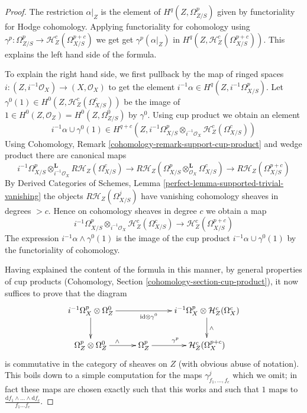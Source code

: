 \documentclass[10pt,a4paper]{amsart}
\theoremstyle{plain}
\theoremstyle{definition}
\theoremstyle{remark}
\numberwithin{equation}{subsection}
\begin{document}
\begin{proof}
The restriction $\alpha|_Z$ is the element of $H^q(Z, \Omega^p_{Z/S})$
given by functoriality for Hodge cohomology. Applying functoriality
for cohomology using
$\gamma^p : \Omega^p_{Z/S} \to \mathcal{H}^c_Z(\Omega^{p + c}_{X/S})$
we get get $\gamma^p(\alpha|_Z)$ in
$H^q(Z, \mathcal{H}^c_Z(\Omega^{p + c}_{X/S}))$.
This explains the left hand side of the formula.

\medskip\noindent
To explain the right hand side, we first pullback by the map
of ringed spaces $i : (Z, i^{-1}\mathcal{O}_X) \to (X, \mathcal{O}_X)$
to get the element $i^{-1}\alpha \in H^q(Z, i^{-1}\Omega^p_{X/S})$.
Let $\gamma^0(1) \in H^0(Z, \mathcal{H}_Z^c(\Omega^c_{X/S}))$
be the image of $1 \in H^0(Z, \mathcal{O}_Z) = H^0(Z, \Omega^0_{Z/S})$
by $\gamma^0$. Using cup product we obtain an element
$$
i^{-1}\alpha \cup \gamma^0(1)
\in
H^{q + c}(Z, 
i^{-1}\Omega^p_{X/S} \otimes_{i^{-1}\mathcal{O}_X}
\mathcal{H}^c_Z(\Omega^c_{X/S}))
$$
Using Cohomology, Remark \ref{cohomology-remark-support-cup-product}
and wedge product there are canonical maps
$$
i^{-1}\Omega^p_{X/S} \otimes_{i^{-1}\mathcal{O}_X}^\mathbf{L}
R\mathcal{H}_Z(\Omega^c_{X/S}) \to
R\mathcal{H}_Z(\Omega^p_{X/S} \otimes_{\mathcal{O}_X}^\mathbf{L}
\Omega^c_{X/S}) \to
R\mathcal{H}_Z(\Omega^{p + c}_{X/S})
$$
By Derived Categories of Schemes, Lemma
\ref{perfect-lemma-supported-trivial-vanishing}
the objects $R\mathcal{H}_Z(\Omega^j_{X/S})$ have vanishing
cohomology sheaves in degrees $> c$. Hence on cohomology
sheaves in degree $c$ we obtain a map
$$
i^{-1}\Omega^p_{X/S} \otimes_{i^{-1}\mathcal{O}_X}
\mathcal{H}^c_Z(\Omega^c_{X/S}) \longrightarrow
\mathcal{H}^c_Z(\Omega^{p + c}_{X/S})
$$
The expression $i^{-1}\alpha \wedge \gamma^0(1)$ is the image
of the cup product $i^{-1}\alpha \cup \gamma^0(1)$ by the
functoriality of cohomology.

\medskip\noindent
Having explained the content of the formula in this manner, by
general properties of cup products
(Cohomology, Section \ref{cohomology-section-cup-product}),
it now suffices to prove that the diagram
$$
\xymatrix{
i^{-1}\Omega^p_X \otimes \Omega^0_Z \ar[rr]_{\text{id} \otimes \gamma^0}
\ar[d] & &
i^{-1}\Omega^p_X \otimes \mathcal{H}^c_Z(\Omega^c_X) \ar[d]^\wedge \\
\Omega^p_Z \otimes \Omega^0_Z \ar[r]^\wedge &
\Omega^p_Z \ar[r]^{\gamma^p} &
\mathcal{H}^c_Z(\Omega^{p + c}_X)
}
$$
is commutative in the category of sheaves on $Z$ (with obvious abuse of
notation). This boils down to a simple computation for the maps
$\gamma^j_{f_1, \ldots, f_c}$ which we omit; in fact these maps
are chosen exactly such that this works and such that $1$ maps to
$\frac{\text{d}f_1 \wedge \ldots \wedge \text{d}f_c}{f_1 \ldots f_c}$.
\end{proof}
\end{document}
